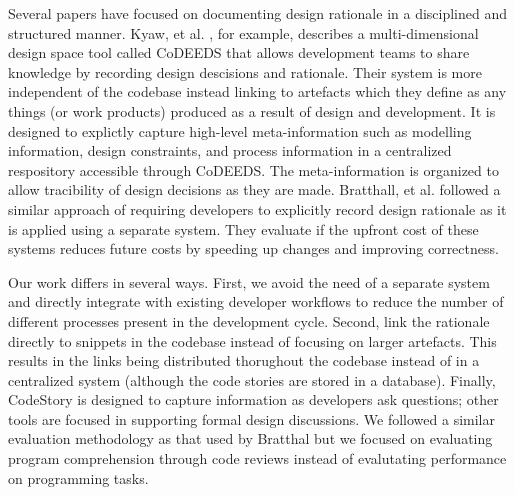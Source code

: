 \documentclass[../manifest.tex]{subfiles}
\begin{document}
Several papers have focused on documenting design rationale in a disciplined and structured manner.  Kyaw, et al. \cite{PK2003}, for example, describes a multi-dimensional design space tool called CoDEEDS that allows development teams to share knowledge by recording design descisions and rationale. Their system is more independent of the codebase instead linking to artefacts which they define as any things (or work products) produced as a result of design and development. It is designed to explictly capture high-level meta-information such as modelling information, design constraints, and process information in a centralized respository accessible through CoDEEDS. The meta-information is organized to allow tracibility of design decisions as they are made. Bratthall, et al. \cite{LB2000} followed a similar approach of requiring developers to explicitly record design rationale as it is applied using a separate system. They evaluate if the upfront cost of these systems reduces future costs by speeding up changes and improving correctness.

Our work differs in several ways. First, we avoid the need of a separate system and directly integrate with existing developer workflows to reduce the number of different processes present in the development cycle. Second, link the rationale directly to snippets in the codebase instead of focusing on larger artefacts. This results in the links being distributed thorughout the codebase instead of in a centralized system (although the code stories are stored in a database). Finally, CodeStory is designed to capture information as developers ask questions; other tools are focused in supporting formal design discussions. We followed a similar evaluation methodology as that used by Bratthal but we focused on evaluating program comprehension through code reviews instead of evalutating performance on programming tasks.

%
%
%
%
\end{document}
